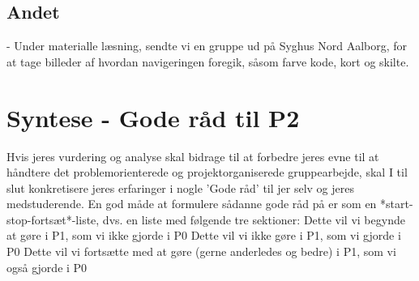 \documentclass[a4paper,12pt,twoside,openright]{memoir}
\begin{document}
        
        \subsection{Andet}
        - Under materialle læsning, sendte vi en gruppe ud på Syghus Nord Aalborg, for at tage billeder af hvordan navigeringen foregik, såsom farve kode, kort og skilte.

    \section{Syntese - Gode råd til P2}
Hvis jeres vurdering og analyse skal bidrage til at forbedre jeres evne til at håndtere det problemorienterede og projektorganiserede gruppearbejde, skal I til slut konkretisere jeres erfaringer i nogle ’Gode råd’ til jer selv og jeres medstuderende. En god måde at formulere sådanne gode råd på er som en *start-stop-fortsæt*-liste, dvs. en liste med følgende tre sektioner: Dette vil vi begynde at gøre i P1, som vi ikke gjorde i P0 Dette vil vi ikke gøre i P1, som vi gjorde i P0 Dette vil vi fortsætte med at gøre (gerne anderledes og bedre) i P1, som vi også gjorde i P0 
\end{document}
